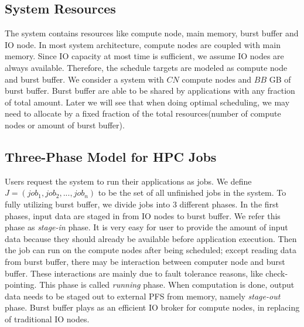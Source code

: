 \subsection{System Resources}
The system contains resources like compute node, main memory, burst buffer and IO node.
In most system architecture, compute nodes are coupled with main memory.
Since IO capacity at most time is sufficient, we assume IO nodes are always available.
Therefore, the schedule targets are modeled as compute node and burst buffer.
We consider a system with $CN$ compute nodes and $BB$ GB of burst buffer.
Burst buffer are able to be shared by applications with any fraction of total amount.
Later we will see that when doing optimal scheduling, we may need to allocate by a fixed
fraction of the total resources(number of compute nodes or amount of burst buffer).

\subsection{Three-Phase Model for HPC Jobs}
Users request the system to run their applications as jobs.
We define $J = (job_1, job_2,..., job_n)$ to be the set of all unfinished jobs in the system.
To fully utilizing burst buffer, we divide jobs into 3 different phases.
In the first phases, input data are staged in from IO nodes to burst buffer.
We refer this phase as \textit{stage-in} phase.
It is very easy for user to provide the amount of input data
because they should already be available before application execution. 
Then the job can run on the compute nodes after being scheduled;
except reading data from burst buffer, there may be interaction between 
computer node and burst buffer.
These interactions are mainly due to fault tolerance reasons, like check-pointing.
This phase is called \textit{running} phase.
When computation is done, output data needs to be staged out to external PFS from memory,
namely \textit{stage-out} phase.
Burst buffer plays as an efficient IO broker for compute nodes,
in replacing of traditional IO nodes.

